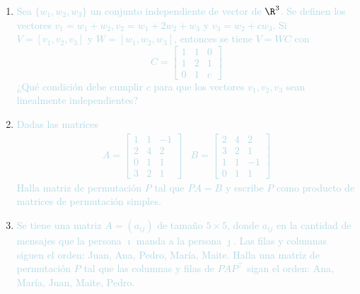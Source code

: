 \begin{center}
	\large\textbf{}
\end{center}
\renewcommand{\arraystretch}{1}
\begin{enumerate}[label=\color{red}\textbf{\arabic*)},leftmargin=*]
	\item \textcolor{lightblue}{Sea $\{w_1,w_2,w_3\}$ un conjunto independiente de vector de $\R^3$. Se definen los vectores $v_1=w_1+w_2,v_2=w_1+2w_2+w_3$ y $v_3=w_2+cw_3$. Si $V=[v_1,v_2,v_3]$ y $W=[w_1,w_2,w_3]$, entonces  se tiene $V=WC$ con \[ C=\begin{bmatrix}
			1 & 1 & 0\\
			1 & 2 & 1\\
			0 & 1 & c
		\end{bmatrix} \] ¿Qué condición debe cumplir $c$ para que los vectores $v_1,v_2,v_3$ sean linealmente independientes?}
	
	
	\item \textcolor{lightblue}{Dadas las matrices \[ \begin{array}{ll}
			A=\begin{bmatrix}
				1 & 1 & -1 \\
				2 & 4 & 2 \\
				0 & 1 & 1 \\
				3 & 2 & 1
			\end{bmatrix}
		& B=\begin{bmatrix}
		2 & 4 & 2 \\
		3 & 2 & 1 \\
		1 & 1 & -1 \\
		0 & 1 & 1
		\end{bmatrix}\end{array} \] Halla matriz de permutación $P$ tal que $PA=B$ y escribe $P$ como producto de matrices de permutación simples.}
	
	
	\item \textcolor{lightblue}{Se tiene una matriz $A=(a_{ij})$ de tamaño $5\times5$, donde $a_{ij}$ en la cantidad de mensajes que la persona $\imath$ manda a la persona $\jmath$. Las filas y columnas siguen el orden: Juan, Ana, Pedro, María, Maite. Halla una matriz de permutación $P$ tal que las columnas y filas de $PAP^\intercal $ sigan el orden: Ana, María, Juan, Maite, Pedro.}
	

\end{enumerate}
